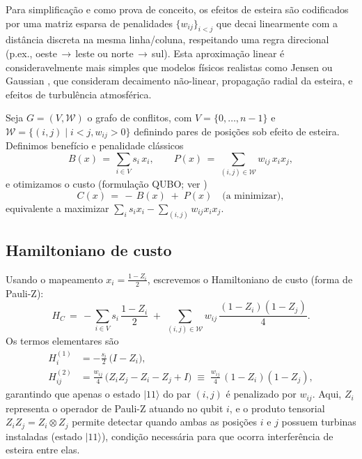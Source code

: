 \documentclass{weciq}
\begin{document}
Para simplificação e como prova de conceito, os efeitos de esteira são codificados por uma matriz esparsa de penalidades $\{w_{ij}\}_{i<j}$ que decai linearmente com a distância discreta na mesma linha/coluna, respeitando uma regra direcional (p.ex., oeste\,$\rightarrow$\,leste ou norte\,$\rightarrow$\,sul). Esta aproximação linear é consideravelmente mais simples que modelos físicos realistas como Jensen \cite{Jensen1983} ou Gaussian \cite{Barthelmie2009}, que consideram decaimento não-linear, propagação radial da esteira, e efeitos de turbulência atmosférica.

Seja $G=(V,\mathcal{W})$ o grafo de conflitos, com $V=\{0,\dots,n-1\}$ e $\mathcal{W} = \{(i,j) \mid i<j, w_{ij}>0\}$ definindo pares de posições sob efeito de esteira.
Definimos benefício e penalidade clássicos
\begin{equation}
  B(x) \,=\, \sum_{i\in V} s_i\,x_i,\qquad
  P(x) \,=\, \sum_{(i,j)\in\mathcal{W}} w_{ij}\, x_i x_j,
\end{equation}
e otimizamos o custo (formulação QUBO; ver \cite{Kochenberger2014, Glover2018})
\begin{equation}
  C(x) \,=\, -\,B(x)\; +\; P(x) \quad \text{(a minimizar)},
\end{equation}
equivalente a maximizar $\sum_i s_i x_i - \sum_{(i,j)} w_{ij} x_i x_j$.

\subsection{Hamiltoniano de custo}
Usando o mapeamento $x_i = \frac{1 - Z_i}{2}$, escrevemos o Hamiltoniano de custo (forma de Pauli-Z):
\begin{equation}
  H_C \,=\, - \sum_{i\in V} s_i\, \frac{1 - Z_i}{2}\; +\; \sum_{(i,j)\in\mathcal{W}} w_{ij}\, \frac{(1 - Z_i)(1 - Z_j)}{4}.
\end{equation}
Os termos elementares são
\begin{align}
  H^{(1)}_i &= -\frac{s_i}{2}\,\big(I - Z_i\big), \\
  H^{(2)}_{ij} &= \frac{w_{ij}}{4}\,\big( Z_i Z_j - Z_i - Z_j + I \big) \;\equiv\; \frac{w_{ij}}{4}\,(1 - Z_i)(1 - Z_j),
\end{align}
garantindo que apenas o estado $|11\rangle$ do par $(i,j)$ é penalizado por $w_{ij}$. Aqui, $Z_i$ representa o operador de Pauli-Z atuando no qubit $i$, e o produto tensorial $Z_iZ_j = Z_i \otimes Z_j$ permite detectar quando ambas as posições $i$ e $j$ possuem turbinas instaladas (estado $|11\rangle$), condição necessária para que ocorra interferência de esteira entre elas.
\end{document}
